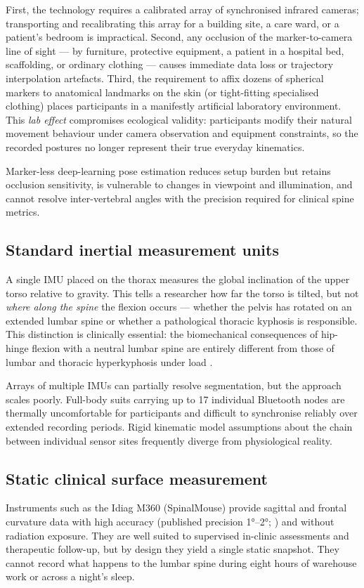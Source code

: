First, the technology requires a calibrated array of synchronised infrared cameras;
transporting and recalibrating this array for a building site, a care ward, or a
patient's bedroom is impractical.
Second, any occlusion of the marker-to-camera line of sight --- by furniture, protective
equipment, a patient in a hospital bed, scaffolding, or ordinary clothing --- causes
immediate data loss or trajectory interpolation artefacts.
Third, the requirement to affix dozens of spherical markers to anatomical landmarks on
the skin (or tight-fitting specialised clothing) places participants in a manifestly
artificial laboratory environment.
This \emph{lab effect} compromises ecological validity: participants modify their
natural movement behaviour under camera observation and equipment constraints, so the
recorded postures no longer represent their true everyday kinematics.

Marker-less deep-learning pose estimation reduces setup burden but retains
occlusion sensitivity, is vulnerable to changes in viewpoint and illumination,
and cannot resolve inter-vertebral angles with the precision required for clinical
spine metrics.

\subsection{Standard inertial measurement units}

A single \acs{IMU} placed on the thorax measures the global inclination of the upper torso
relative to gravity.
This tells a researcher how far the torso is tilted, but not \emph{where along the
	spine} the flexion occurs --- whether the pelvis has rotated on an extended lumbar spine
or whether a pathological thoracic kyphosis is responsible.
This distinction is clinically essential: the biomechanical consequences of hip-hinge
flexion with a neutral lumbar spine are entirely different from those of lumbar and
thoracic hyperkyphosis under load \cite{burdorf1997}.

Arrays of multiple \acp{IMU} can partially resolve segmentation, but the approach
scales poorly.
Full-body suits carrying up to 17 individual Bluetooth nodes are thermally
uncomfortable for participants and difficult to synchronise reliably over extended
recording periods.
Rigid kinematic model assumptions about the chain between individual sensor sites
frequently diverge from physiological reality.

\subsection{Static clinical surface measurement}

Instruments such as the Idiag M360 (SpinalMouse) provide sagittal and frontal
curvature data with high accuracy (published precision \ang{1}--\ang{2};
\cite{spinalMouse}) and without radiation exposure.
They are well suited to supervised in-clinic assessments and therapeutic follow-up, but
by design they yield a single static snapshot.
They cannot record what happens to the lumbar spine during eight hours of warehouse work
or across a night's sleep.
